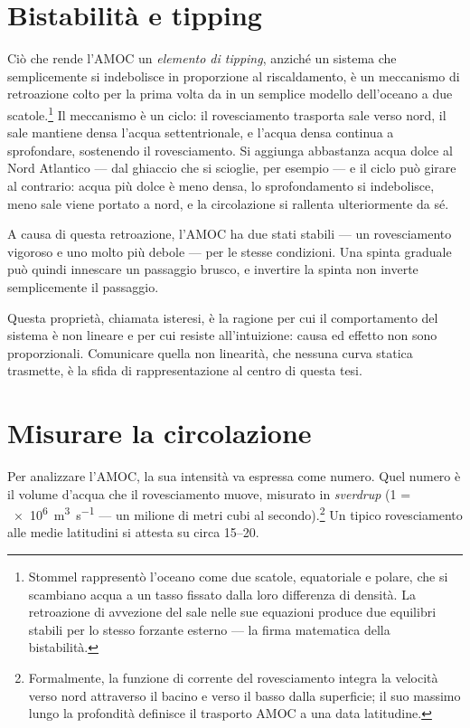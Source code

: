 \section{Bistabilità e tipping}
\label{sec:bg-bistability}

Ciò che rende l'AMOC un \emph{elemento di tipping}, anziché un sistema che semplicemente si indebolisce in proporzione al riscaldamento, è un meccanismo di retroazione colto per la prima volta da \citet{stommel1961} in un semplice modello dell'oceano a due scatole.\footnote{Stommel rappresentò l'oceano come due scatole, equatoriale e polare, che si scambiano acqua a un tasso fissato dalla loro differenza di densità. La retroazione di avvezione del sale nelle sue equazioni produce due equilibri stabili per lo stesso forzante esterno --- la firma matematica della bistabilità.} Il meccanismo è un ciclo: il rovesciamento trasporta sale verso nord, il sale mantiene densa l'acqua settentrionale, e l'acqua densa continua a sprofondare, sostenendo il rovesciamento. Si aggiunga abbastanza acqua dolce al Nord Atlantico --- dal ghiaccio che si scioglie, per esempio --- e il ciclo può girare al contrario: acqua più dolce è meno densa, lo sprofondamento si indebolisce, meno sale viene portato a nord, e la circolazione si rallenta ulteriormente da sé.

A causa di questa retroazione, l'AMOC ha due stati stabili --- un rovesciamento vigoroso e uno molto più debole --- per le stesse condizioni. Una spinta graduale può quindi innescare un passaggio brusco, e invertire la spinta non inverte semplicemente il passaggio.

Questa proprietà, chiamata isteresi, è la ragione per cui il comportamento del sistema è non lineare e per cui resiste all'intuizione: causa ed effetto non sono proporzionali. Comunicare quella non linearità, che nessuna curva statica trasmette, è la sfida di rappresentazione al centro di questa tesi.

\section{Misurare la circolazione}
\label{sec:bg-measurement}

Per analizzare l'AMOC, la sua intensità va espressa come numero. Quel numero è il volume d'acqua che il rovesciamento muove, misurato in \emph{sverdrup} (\SI{1}{\sverdrup} = \SI{e6}{\cubic\metre\per\second} --- un milione di metri cubi al secondo).\footnote{Formalmente, la funzione di corrente del rovesciamento integra la velocità verso nord attraverso il bacino e verso il basso dalla superficie; il suo massimo lungo la profondità definisce il trasporto AMOC a una data latitudine.} Un tipico rovesciamento alle medie latitudini si attesta su circa \SIrange{15}{20}{\sverdrup}.

